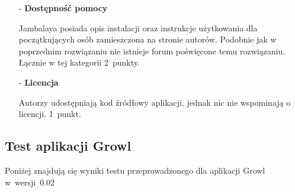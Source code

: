 \begin{enumerate}
\begin{itemize}
 \item[-]{\bf Dostępność pomocy  } 

  \nopagebreak
Jambalaya posiada opis instalacji oraz instrukcje użytkowania dla początkujących osób zamieszczona na stronie autorów.
 Podobnie jak w poprzednim rozwiązaniu nie istnieje forum poświęcone temu rozwiązaniu. Łącznie w tej kategorii 2~punkty.



 \item[-]{\bf Licencja  } 

  \nopagebreak
Autorzy udostępniają kod źródłowy aplikacji, jednak nic nie wspominają o licencji. 1~punkt.
\end{itemize}


\end{enumerate}


\subsection*{Test aplikacji Growl}

Poniżej znajdują się wyniki testu przeprowadzonego dla aplikacji Growl w~wersji~0.02

